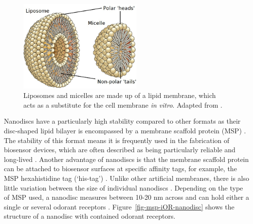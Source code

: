 \documentclass[
  a4paper,
]{scrbook}
\begin{document}
\begin{figure}

{\centering \includegraphics[width=0.55\textwidth,height=\textheight]{figures/ch3/OSC_Microbio_07_03_micelle_edit.png}

}

\caption{\label{fig-micelle}Liposomes and micelles are made up of a
lipid membrane, which acts as a substitute for the cell membrane
\emph{in vitro}. Adapted from \autocite{Micelle}.}

\end{figure}

Nanodiscs have a particularly high stability compared to other formats
as their disc-shaped lipid bilayer is encompassed by a membrane scaffold
protein (MSP) \autocite{Nath2007,Bayburt2010}. The stability of this
format means it is frequently used in the fabrication of biosensor
devices, which are often described as being particularly reliable and
long-lived \autocite{Goldsmith2011,Yang2018,Moon2020,Cheema2021}.
Another advantage of nanodiscs is that the membrane scaffold protein can
be attached to biosensor surfaces at specific affinity tags, for
example, the MSP hexahistidine tag (`his-tag') \autocite{Bayburt2010}.
Unlike other artificial membranes, there is also little variation
between the size of individual nanodiscs \autocite{Nath2007}. Depending
on the type of MSP used, a nanodisc measures between 10-20 nm across and
can hold either a single or several odorant receptors
\autocite{Nath2007,Bayburt2010}. Figure~\ref{fig-msp-iOR-nanodisc} shows
the structure of a nanodisc with contained odorant receptors.
\end{document}
